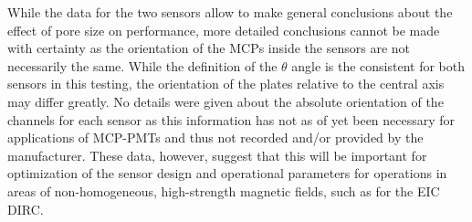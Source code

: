While the data for the two sensors allow to make general conclusions about the effect of pore size on performance, more detailed conclusions cannot be made with certainty as the orientation of the MCPs inside the sensors are not necessarily the same. While the definition of the $\theta$ angle is the consistent for both sensors in this testing, the orientation of the plates relative to the central axis may differ greatly. No details were given about the absolute orientation of the channels for each sensor as this information has not as of yet been necessary for applications of MCP-PMTs and thus not recorded and/or provided by the manufacturer. These data, however, suggest that this will be important for optimization of the sensor design and operational parameters for operations in areas of non-homogeneous, high-strength magnetic fields, such as for the EIC DIRC.
